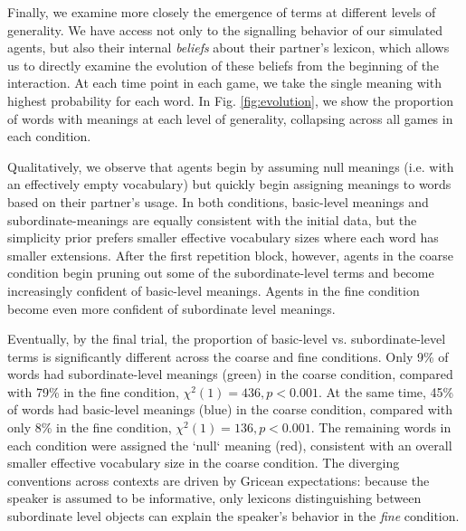 Finally, we examine more closely the emergence of terms at different levels of generality.
We have access not only to the signalling behavior of our simulated agents, but also their internal \emph{beliefs} about their partner's lexicon, which allows us to directly examine the evolution of these beliefs from the beginning of the interaction.
At each time point in each game, we take the single meaning with highest probability for each word.
In Fig. \ref{fig:evolution}, we show the proportion of words with meanings at each level of generality, collapsing across all games in each condition.




Qualitatively, we observe that agents begin by assuming null meanings (i.e. with an effectively empty vocabulary) but quickly begin assigning meanings to words based on their partner's usage.
In both conditions, basic-level meanings and subordinate-meanings are equally consistent with the initial data, but the simplicity prior prefers smaller effective vocabulary sizes where each word has smaller extensions.
After the first repetition block, however, agents in the coarse condition begin pruning out some of the subordinate-level terms and become increasingly confident of basic-level meanings.
Agents in the fine condition become even more confident of subordinate level meanings.

Eventually, by the final trial, the proportion of basic-level vs. subordinate-level terms is significantly different across the coarse and fine conditions.
Only 9\% of words had subordinate-level meanings (green) in the coarse condition, compared with 79\% in the fine condition, $\chi^2(1) = 436, p < 0.001$.
At the same time, 45\% of words had basic-level meanings (blue) in the coarse condition, compared with only 8\% in the fine condition, $\chi^2(1) = 136, p < 0.001$.
The remaining words in each condition were assigned the `null` meaning (red), consistent with an overall smaller effective vocabulary size in the coarse condition.
The diverging conventions across contexts are driven by Gricean expectations: because the speaker is assumed to be informative, only lexicons distinguishing between subordinate level objects can explain the speaker's behavior in the \emph{fine} condition.

